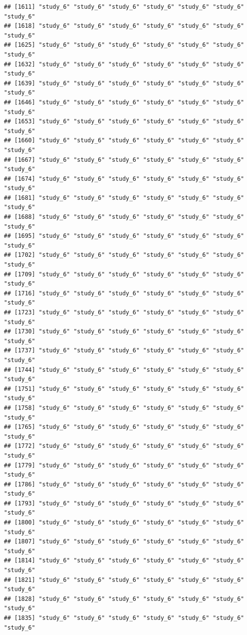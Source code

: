 \documentclass[
  american,
  man,floatsintext]{apa7}
\begin{document}
\begin{verbatim}
## [1611] "study_6" "study_6" "study_6" "study_6" "study_6" "study_6" "study_6"
## [1618] "study_6" "study_6" "study_6" "study_6" "study_6" "study_6" "study_6"
## [1625] "study_6" "study_6" "study_6" "study_6" "study_6" "study_6" "study_6"
## [1632] "study_6" "study_6" "study_6" "study_6" "study_6" "study_6" "study_6"
## [1639] "study_6" "study_6" "study_6" "study_6" "study_6" "study_6" "study_6"
## [1646] "study_6" "study_6" "study_6" "study_6" "study_6" "study_6" "study_6"
## [1653] "study_6" "study_6" "study_6" "study_6" "study_6" "study_6" "study_6"
## [1660] "study_6" "study_6" "study_6" "study_6" "study_6" "study_6" "study_6"
## [1667] "study_6" "study_6" "study_6" "study_6" "study_6" "study_6" "study_6"
## [1674] "study_6" "study_6" "study_6" "study_6" "study_6" "study_6" "study_6"
## [1681] "study_6" "study_6" "study_6" "study_6" "study_6" "study_6" "study_6"
## [1688] "study_6" "study_6" "study_6" "study_6" "study_6" "study_6" "study_6"
## [1695] "study_6" "study_6" "study_6" "study_6" "study_6" "study_6" "study_6"
## [1702] "study_6" "study_6" "study_6" "study_6" "study_6" "study_6" "study_6"
## [1709] "study_6" "study_6" "study_6" "study_6" "study_6" "study_6" "study_6"
## [1716] "study_6" "study_6" "study_6" "study_6" "study_6" "study_6" "study_6"
## [1723] "study_6" "study_6" "study_6" "study_6" "study_6" "study_6" "study_6"
## [1730] "study_6" "study_6" "study_6" "study_6" "study_6" "study_6" "study_6"
## [1737] "study_6" "study_6" "study_6" "study_6" "study_6" "study_6" "study_6"
## [1744] "study_6" "study_6" "study_6" "study_6" "study_6" "study_6" "study_6"
## [1751] "study_6" "study_6" "study_6" "study_6" "study_6" "study_6" "study_6"
## [1758] "study_6" "study_6" "study_6" "study_6" "study_6" "study_6" "study_6"
## [1765] "study_6" "study_6" "study_6" "study_6" "study_6" "study_6" "study_6"
## [1772] "study_6" "study_6" "study_6" "study_6" "study_6" "study_6" "study_6"
## [1779] "study_6" "study_6" "study_6" "study_6" "study_6" "study_6" "study_6"
## [1786] "study_6" "study_6" "study_6" "study_6" "study_6" "study_6" "study_6"
## [1793] "study_6" "study_6" "study_6" "study_6" "study_6" "study_6" "study_6"
## [1800] "study_6" "study_6" "study_6" "study_6" "study_6" "study_6" "study_6"
## [1807] "study_6" "study_6" "study_6" "study_6" "study_6" "study_6" "study_6"
## [1814] "study_6" "study_6" "study_6" "study_6" "study_6" "study_6" "study_6"
## [1821] "study_6" "study_6" "study_6" "study_6" "study_6" "study_6" "study_6"
## [1828] "study_6" "study_6" "study_6" "study_6" "study_6" "study_6" "study_6"
## [1835] "study_6" "study_6" "study_6" "study_6" "study_6" "study_6" "study_6"

\end{verbatim}
\end{document}
